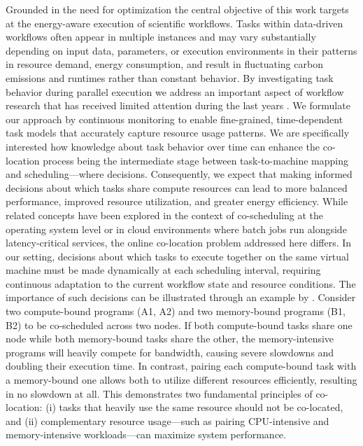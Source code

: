 Grounded in the need for optimization the central objective of this work targets at the energy-aware execution of scientific workflows. Tasks within data-driven workflows often appear in multiple instances and may vary substantially depending on input data, parameters, or execution environments in their patterns in resource demand, energy consumption, and result in fluctuating carbon emissions and runtimes rather than constant behavior. By investigating task behavior during parallel execution we address an important aspect of workflow research that has received limited attention during the last years \cite{9284517} \cite{Choudhary_2022} \cite{Durillo_2014}.
We formulate our approach by continuous monitoring to enable fine-grained, time-dependent task models that accurately capture resource usage patterns. We are specifically interested how knowledge about task behavior over time can enhance the co-location process being the intermediate stage between task-to-machine mapping and scheduling—where decisions.
Consequently, we expect that making informed decisions about which tasks share compute resources can lead to more balanced performance, improved resource utilization, and greater energy efficiency.
While related concepts have been explored in the context of co-scheduling at the operating system level or in cloud environments where batch jobs run alongside latency-critical services, the online co-location problem addressed here differs. In our setting, decisions about which tasks to execute together on the same virtual machine must be made dynamically at each scheduling interval, requiring continuous adaptation to the current workflow state and resource conditions. The importance of such decisions can be illustrated through an example by \cite{inproceedings}. Consider two compute-bound programs (A1, A2) and two memory-bound programs (B1, B2) to be co-scheduled across two nodes. If both compute-bound tasks share one node while both memory-bound tasks share the other, the memory-intensive programs will heavily compete for bandwidth, causing severe slowdowns and doubling their execution time. In contrast, pairing each compute-bound task with a memory-bound one allows both to utilize different resources efficiently, resulting in no slowdown at all. This demonstrates two fundamental principles of co-location: (i) tasks that heavily use the same resource should not be co-located, and (ii) complementary resource usage—such as pairing CPU-intensive and memory-intensive workloads—can maximize system performance.
